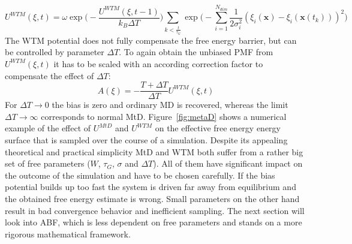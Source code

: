 \begin{equation}
  U^{WTM}(\xi,t) = \omega \exp \biggl(-\frac{U^{WTM}(\xi,t-1)}{k_B \Delta T}\biggr) \sum_{k<\frac{t}{\tau_G}} \exp\biggr(-\sum_{i=1}^{N_{dim}} \frac{1}{2\sigma_{i}^{2}} (\xi_{i}(\textbf{x})-\xi_{i}(\textbf{x}(t_k)))^2 \biggl)
  \label{eq:WTM}
\end{equation}
The WTM potential does not fully compensate the free energy barrier, but can be controlled by parameter $\Delta T$.
To again obtain the unbiased PMF from $U^{WTM}(\xi,t)$ it has to be scaled with an according correction factor to compensate the effect of $\Delta T$:
\begin{equation}
A(\xi) = -\frac{T+\Delta T}{\Delta T}U^{WTM}(\xi, t)
\end{equation}
For $\Delta T \to 0$ the bias is zero and ordinary MD is recovered, whereas the limit $\Delta T \to \infty$ corresponds to normal MtD. Figure~\ref{fig:metaD} shows a numerical example of the effect of $U^{MtD}$ and $U^{WTM}$ on the effective free energy energy surface that is sampled over the course of a simulation.
Despite its appealing theoretical and practical simplicity MtD and WTM both suffer from a rather big set of free parameters ($W$, $\tau_G$, $\sigma$ and $\Delta T$). All of them have significant impact on the outcome of the simulation and have to be chosen carefully. If the bias potential builds up too fast the system is driven far away from equilibrium and the obtained free energy estimate is wrong. Small parameters on the other hand result in bad convergence behavior and inefficient sampling.\autocite{laio2005assessing}
The next section will look into ABF, which is less dependent on free parameters and stands on a more rigorous mathematical framework.

